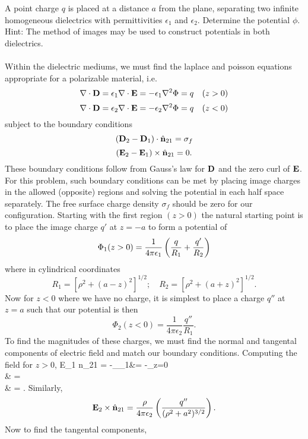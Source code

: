 \documentclass[11pt,letterpaper]{article}
\begin{document}
	\item
	A point charge $q$ is placed at a distance $a$ from the plane, separating two infinite homogeneous dielectrics with permittivities 
	$\epsilon_1$ and $\epsilon_2$. Determine the potential $\phi$.
	\\
	Hint: The method of images may be used to construct potentials in both dielectrics.
	\\
	\\
	Within the dielectric mediums, we must find the laplace and poisson equations appropriate for a polarizable material, i.e.
	\[
		\nabla\cdot \mathbf{D} = \epsilon_1\nabla\cdot\mathbf{E} = -\epsilon_1\nabla^2\Phi = q\quad (z>0)
	\]
	\[
		\nabla\cdot \mathbf{D} = \epsilon_2\nabla\cdot\mathbf{E} = -\epsilon_2\nabla^2\Phi = q\quad (z<0)
	\]
	subject to the boundary conditions
	\[
		(\mathbf{D}_2-\mathbf{D}_1)\cdot \hat{\mathbf{n}}_{21} = \sigma_f 
	\]
	\[
		(\mathbf{E}_2-\mathbf{E}_1)\times \hat{\mathbf{n}}_{21} = 0.
	\]
	These boundary conditions follow from Gauss's law for $\mathbf{D}$ and the zero curl of $\mathbf{E}$. For this problem, such boundary 
	conditions can be met by placing image charges in the allowed (opposite) regions and solving the potential in each
	half space separately. The free surface charge density $\sigma_f$ should be zero for our configuration. Starting with the first region $	(z>0)$ the natural starting point is to place the image charge $q'$ at $z=-a$ to form a potential of
	\[
		\Phi_1(z>0) = \frac{1}{4\pi\epsilon_1}\left(\frac{q}{R_1}+\frac{q'}{R_2}\right)
	\]
	where in cylindrical coordinates
	\[
		R_1 = [\rho^2+(a-z)^2]^{1/2};\quad R_2 = [\rho^2+(a+z)^2]^{1/2}.
	\]
	Now for $z<0$ where we have no charge, it is simplest to place a charge $q''$ at $z=a$ such that our potential is then
	\[
		\Phi_2(z<0) = \frac{1}{4\pi\epsilon_2}\frac{q''}{R_1}.
	\]
	To find the magnitudes of these charges, we must find the normal and tangental components of electric field and match our 
	boundary conditions. Computing the field for $z>0$,
	\ba
		\vect E_1 \times \vecth n_{21} = -\del_\rho\Phi_1&= -_{z=0}\vecth \rho\\
		& = \vecth \rho\\
		& =  \vecth \rho.
	\ea
	Similarly,
	\[
		\mathbf{E}_2 \times \hat{\mathbf{n}}_{21} =  \frac{\rho}{4\pi\epsilon_2}\left(\frac{q''}{(\rho^2+a^2)^{3/2}}\right).
	\]
	Now to find the tangental components,
\end{document}
